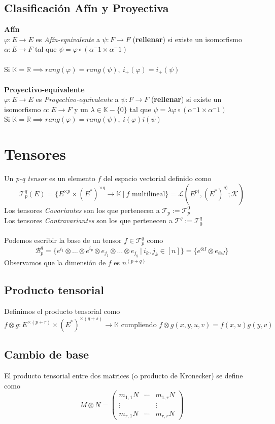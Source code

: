 \documentclass{myclass}
\renewcommand{\phi}{\varphi}
\newcommand{\T}{\mathcal{T}}
\newcommand{\st}{\ | \ }
\begin{document}
\subsection{Clasificación Afín y Proyectiva}
\textbf{Afín}\\
$\phi:E\to E$ es \textit{Afín-equivalente} a $\psi:F\to F$ (\textbf{rellenar}) si existe un isomorfismo $\alpha:E\to F$ tal que $\psi = \phi\circ(\alpha^-1\times \alpha^-1)$ \\
\\
Si $\mathbb{K} = \mathbb{R} \implies rang(\phi) = rang(\psi), \ i_+(\phi) = i_+(\psi)$ \\
\\
\textbf{Proyectivo-equivalente}\\
$\phi:E\to E$ es \textit{Proyectivo-equivalente} a $\psi:F\to F$ (\textbf{rellenar}) si existe un isomorfismo $\alpha:E\to F$ y un $\lambda\in \mathbb{K}-\{0\}$ tal que $\psi = \lambda\phi\circ(\alpha^-1\times \alpha^-1)$ \\
Si $\mathbb{K} = \mathbb{R} \implies rang(\phi) = rang(\psi), \ i(\phi)  i(\psi)$


\section{Tensores}
Un \textit{p-q tensor} es un elemento $f$ del espacio vectorial definido como
$$
\boxed{\T_p^q(E)=\{E^{\times p}\times (E^*)^{\times q} \to \mathbb{K} \st f \text{ multilineal}\} = \mathcal{L}(E^{p)}, (E^*)^{q)};\mathcal{K})}
$$
Los tensores \textit{Covariantes} son los que pertenecen a $\T_p:=\T_p^0$ \\
Los tensores \textit{Contravariantes} son los que pertenecen a $\T^q:=\T_0^q$ \\
\\
Podemos escribir la base de un tensor $f\in \T_p^q$ como
$$
\mathcal{B}_p^q=\{e^{i_1}\otimes \ldots \otimes e^{i_p}\otimes e_{j_1}\otimes \ldots \otimes e_{j_q} \st i_k, j_k\in [n]\} = \{e^{\otimes I}\otimes e_{\otimes J}\}
$$
Observamos que la dimensión de $f$ es $n^{(p+q)}$

\subsection{Producto tensorial}
Definimos el producto tensorial como
$$
f\otimes g:E^{\times(p+r)}\times (E^*)^{\times(q+s)} \to \mathbb{K} \text{ cumpliendo } \boxed{f\otimes g (x, y, u, v) = f(x, u)g(y,v)  }  
$$

\subsection{Cambio de base}
El producto tensorial entre dos matrices (o producto de Kronecker) se define como
$$
M\otimes N = \begin{pmatrix}
m_{1,1}N & \cdots & m_{1,r}N\\
\vdots &  & \vdots \\
m_{r,1}N & \cdots & m_{r,r}N
\end{pmatrix}
$$
\end{document}
